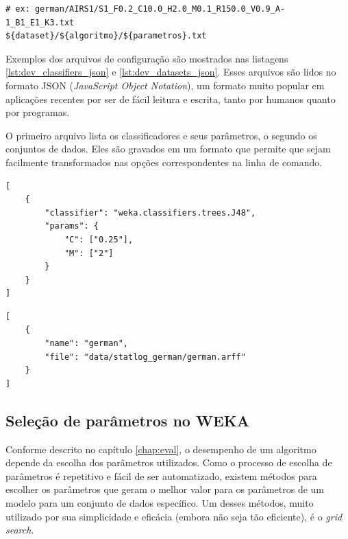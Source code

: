 \vspace{0.5cm}
\begin{lstlisting}[caption=Formato do nome do arquivo de resultados, label=lst:dev_output_filename]
# ex: german/AIRS1/S1_F0.2_C10.0_H2.0_M0.1_R150.0_V0.9_A-1_B1_E1_K3.txt
${dataset}/${algoritmo}/${parametros}.txt
\end{lstlisting}
\vspace{0.5cm}

Exemplos dos arquivos de configuração são mostrados nas listagens \ref{lst:dev_classifiers_json} e \ref{lst:dev_datasets_json}. Esses arquivos são lidos no formato JSON (\emph{JavaScript Object Notation}), um formato muito popular em aplicações recentes por ser de fácil leitura e escrita, tanto por humanos quanto por programas.

O primeiro arquivo lista os classificadores e seus parâmetros, o segundo os conjuntos de dados. Eles são gravados em um formato que permite que sejam facilmente transformados nas opções correspondentes na linha de comando.

\vspace{0.5cm}
\begin{lstlisting}[caption=Exemplo de arquivos de configuração de classificadores, label=lst:dev_classifiers_json]
[
    {
        "classifier": "weka.classifiers.trees.J48",
        "params": {
            "C": ["0.25"],
            "M": ["2"]
        }
    }
]
\end{lstlisting}

\begin{lstlisting}[caption=Exemplo de arquivos de configuração de conjuntos de dados, label=lst:dev_datasets_json]
[
    {
        "name": "german",
        "file": "data/statlog_german/german.arff"
    }
]
\end{lstlisting}
\vspace{0.5cm}

\subsection{Seleção de parâmetros no WEKA}

Conforme descrito no capítulo \ref{chap:eval}, o desempenho de um algoritmo depende da escolha dos parâmetros utilizados. Como o processo de escolha de parâmetros é repetitivo e fácil de ser automatizado, existem métodos para escolher os parâmetros que geram o melhor valor para os parâmetros de um modelo para um conjunto de dados específico. Um desses métodos, muito utilizado por sua simplicidade e eficácia (embora não seja tão eficiente), é o \emph{grid search}.

